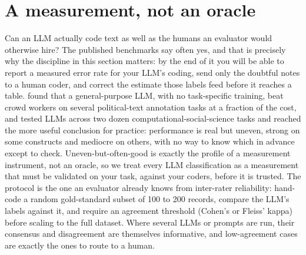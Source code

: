 \documentclass[
    a4paper,
    fontsize=10pt,
    twoside=true,
    numbers=noenddot,
]{kaobook}
\begin{document}
\section{A measurement, not an oracle}\label{sec:aiverify}
Can an LLM actually code text as well as the humans an evaluator would otherwise hire? The published benchmarks say often yes, and that is precisely why the discipline in this section matters: by the end of it you will be able to report a measured error rate for your LLM's coding, send only the doubtful notes to a human coder, and correct the estimate those labels feed before it reaches a table. \textcite{gilardi2023annotation} found that a general-purpose LLM, with no task-specific training, beat crowd workers on several political-text annotation tasks at a fraction of the cost, and \textcite{ziems2024css} tested LLMs across two dozen computational-social-science tasks and reached the more useful conclusion for practice: performance is real but uneven, strong on some constructs and mediocre on others, with no way to know which in advance except to check. Uneven-but-often-good is exactly the profile of a measurement instrument, not an oracle, so we treat every LLM classification as a measurement that must be validated on your task, against your coders, before it is trusted. The protocol is the one an evaluator already knows from inter-rater reliability: hand-code a random gold-standard subset of 100 to 200 records, compare the LLM's labels against it, and require an agreement threshold (Cohen's or Fleiss' kappa) before scaling to the full dataset. Where several LLMs or prompts are run, their consensus and disagreement are themselves informative, and low-agreement cases are exactly the ones to route to a human.
\end{document}
